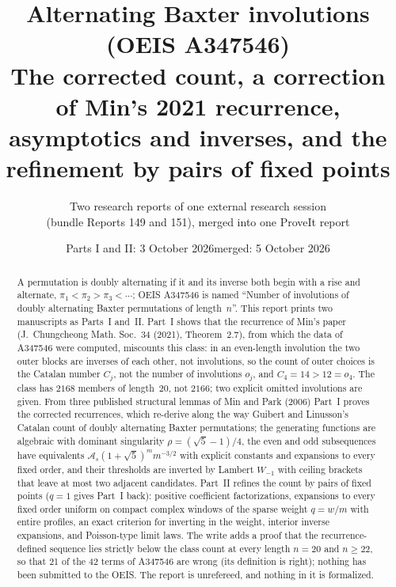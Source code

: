 \documentclass[11pt,letterpaper]{article}
\title{\textbf{Alternating Baxter involutions (OEIS A347546)}\\[7pt]
\large The corrected count, a correction of Min's 2021 recurrence,\\ asymptotics and inverses, and the refinement by pairs of fixed points}
\author{Two research reports of one external research session\\(bundle Reports 149 and 151), merged into one ProveIt report}
\date{Parts I and II: 3 October 2026\quad merged: 5 October 2026}
\numberwithin{equation}{section}
\theoremstyle{remark}\newtheorem{remark}[theorem]{Remark}
\begin{document}
\hypersetup{pageanchor=false}
\maketitle
\begin{abstract}
A permutation is doubly alternating if it and its inverse both begin with a rise and alternate, $\pi_1<\pi_2>\pi_3<\cdots$; OEIS A347546 is named ``Number of involutions of doubly alternating Baxter permutations of length~$n$''. This report prints two manuscripts as Parts~I and~II. Part~I shows that the recurrence of Min's paper (J.~Chungcheong Math. Soc.~34 (2021), Theorem~2.7), from which the data of A347546 were computed, miscounts this class: in an even-length involution the two outer blocks are inverses of each other, not involutions, so the count of outer choices is the Catalan number $C_j$, not the number of involutions $o_j$, and $C_4=14>12=o_4$. The class has $2168$ members of length~$20$, not $2166$; two explicit omitted involutions are given. From three published structural lemmas of Min and Park (2006) Part~I proves the corrected recurrences, which re-derive along the way Guibert and Linusson's Catalan count of doubly alternating Baxter permutations; the generating functions are algebraic with dominant singularity $\rho=(\sqrt5-1)/4$, the even and odd subsequences have equivalents $\mathcal A_s(1+\sqrt5)^mm^{-3/2}$ with explicit constants and expansions to every fixed order, and their thresholds are inverted by Lambert $W_{-1}$ with ceiling brackets that leave at most two adjacent candidates. Part~II refines the count by pairs of fixed points ($q=1$ gives Part~I back): positive coefficient factorizations, expansions to every fixed order uniform on compact complex windows of the sparse weight $q=w/m$ with entire profiles, an exact criterion for inverting in the weight, interior inverse expansions, and Poisson-type limit laws. The write adds a proof that the recurrence-defined sequence lies strictly below the class count at every length $n=20$ and $n\ge22$, so that 21 of the 42 terms of A347546 are wrong (its definition is right); nothing has been submitted to the OEIS. The report is unrefereed, and nothing in it is formalized.
\end{abstract}
\hypersetup{pageanchor=true}
\setcounter{tocdepth}{1}
{\small\setlength{\parskip}{0pt}\tableofcontents}
\newpage
\end{document}
